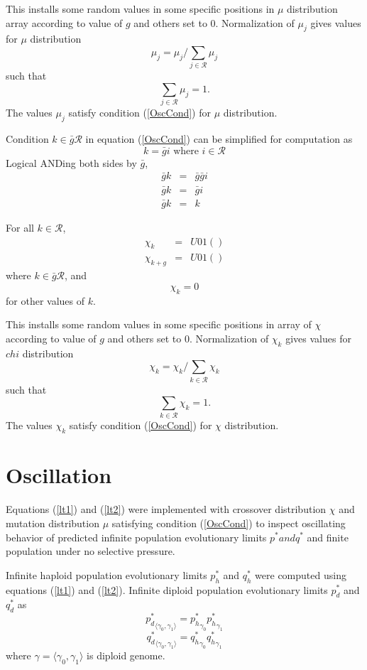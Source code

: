 This installs some random values in some specific positions in $\mu$ distribution array according to value of $g$ and others set to $0$. 
Normalization of $\mu_j$ gives values for $\mu$ distribution
\[
\mu_j = \mu_j / \sum \limits_{j \in \mathcal{R} } \mu_j
\]
such that 
\[
\sum \limits_{j \in \mathcal{R} } \mu_j = 1.
\]
The values $\mu_j$ satisfy condition (\ref{OscCond}) for $\mu$ distribution.


Condition $k \in \bar{g} \mathcal{R}$ in equation (\ref{OscCond}) can be simplified for computation as
\[
k = \bar{g} i  \text{ where $i \in \mathcal{R}$}
\]
Logical ANDing both sides by $\bar{g}$,
\begin{eqnarray*}
\bar{g} k & = & \bar{g} \bar{g} i \\
\bar{g} k & = & \bar{g} i \\
\bar{g} k & = & k 
\end{eqnarray*}

For all $k \in \mathcal{R}$,
\begin{eqnarray*}
\chi_k & = & U01() \\
\chi_{k+g} & = & U01() 
\end{eqnarray*}
where $k \in \bar{g} \mathcal{R}$, and
\[
\chi_k = 0
\]
for other values of $k$. \newline

This installs some random values in some specific positions in array of $\chi$ according to value of $g$ and others set to $0$. Normalization of $\chi_k$ gives values for $chi$ distribution 
\[
\chi_k = \chi_k/\sum\limits_{k \in \mathcal{R}} \chi_k
\]
such that 
\[
\sum\limits_{k \in \mathcal{R}} \chi_k = 1.
\]
The values $\chi_k$ satisfy condition (\ref{OscCond}) for $\chi$ distribution.

\section{Oscillation}
\label{Oscillation}

Equations (\ref{lt1}) and (\ref{lt2}) were implemented with crossover distribution $\chi$ and mutation distribution $\mu$ satisfying condition (\ref{OscCond}) to inspect oscillating behavior of predicted infinite population evolutionary limits $p^{\ast} and q^{\ast}$ and finite population under no selective pressure.

Infinite haploid population evolutionary limits $p_h^{\ast}$ and $q_h^{\ast}$ were computed using equations (\ref{lt1}) and (\ref{lt2}). Infinite diploid population evolutionary limits $p_d^{\ast}$ and $q_d^{\ast}$ as
\[
{p_d^{\ast}}_{\langle \gamma_0, \gamma_1 \rangle} = {p_h^{\ast}}_{\gamma_0} {p_h^{\ast}}_{\gamma_1}
\]
\[
{q_d^{\ast}}_{\langle \gamma_0, \gamma_1 \rangle} = {q_h^{\ast}}_{\gamma_0} {q_h^{\ast}}_{\gamma_1}
\]
where $\gamma = \langle \gamma_0, \gamma_1 \rangle$ is diploid genome.



